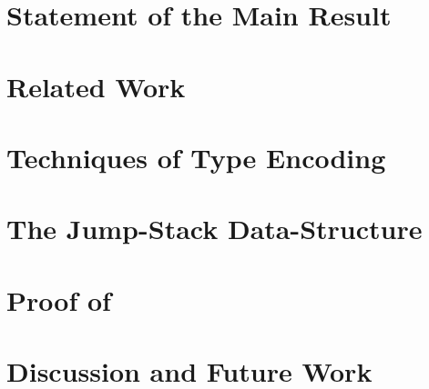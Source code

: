 \documentclass[a4paper,USenglish]{lipics}
\begin{document}
\section{Statement of the Main Result} 
\label{Section:result}


\section{Related Work}
\label{Section:related}


\section{Techniques of Type Encoding}
\label{Section:toolkit}


\section{The Jump-Stack Data-Structure}
\label{Section:jump}


\section{Proof of }
\label{Section:proof}


\section{Discussion and Future Work}
\label{Section:zz}



\small

\end{document}
